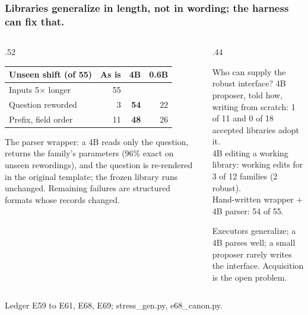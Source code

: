 \documentclass[aspectratio=169,11pt]{beamer}
\newcommand{\source}[1]{\vfill{\scriptsize\color{Gray}#1\par}}
\begin{document}
\begin{frame}[t]
\frametitle{Libraries generalize in length, not in wording; the harness can fix that.}
\begin{columns}[T,onlytextwidth]
\begin{column}{.52\textwidth}
\footnotesize
\begin{tabular}{@{}lrrr@{}}
\toprule
Unseen shift (of 55) & As is & 4B & 0.6B \\
\midrule
Inputs 5$\times$ longer & 55 & & \\
Question reworded & 3 & \textbf{54} & 22 \\
Prefix, field order & 11 & \textbf{48} & 26 \\
\bottomrule
\end{tabular}
\medskip

\small The parser wrapper: a 4B reads only the question, returns the family's parameters (96\% exact on unseen
rewordings), and the question is re-rendered in the original template; the frozen library runs unchanged.
Remaining failures are structured formats whose records changed.
\end{column}
\begin{column}{.44\textwidth}
\begin{block}{Who can supply the robust interface?}
\small
4B proposer, told how, writing from scratch: 1 of 11 and 0 of 18 accepted libraries adopt it.\\
4B editing a working library: working edits for 3 of 12 families (2 robust).\\
Hand-written wrapper + 4B parser: 54 of 55.
\end{block}
\small Executors generalize; a 4B parses well; a small proposer rarely writes the interface. \alert{Acquisition is
the open problem.}
\end{column}
\end{columns}
\source{Ledger E59 to E61, E68, E69; stress\_gen.py, e68\_canon.py.}
\end{frame}
\end{document}
